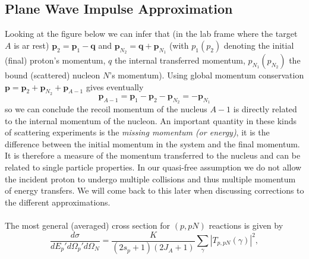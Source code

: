 \documentclass[11pt]{article}
\numberwithin{equation}{section}
\begin{document}
\subsection{Plane Wave Impulse Approximation}
Looking at the figure below we can infer that (in the lab frame where the target $A$ is ar rest) $\mathbf{p}_2 = \mathbf{p}_1 - \mathbf{q}$ and $\mathbf{p}_{N_2} = \mathbf{q} + \mathbf{p}_{N_1}$ (with $p_1 (p_2)$ denoting the initial (final) proton's momentum, $q$ the internal transferred momentum, $p_{N_1} (p_{N_2})$ the bound (scattered) nucleon $N$'s momentum). Using global momentum conservation $\mathbf{p} = \mathbf{p}_2 + \mathbf{p}_{N_2} + \mathbf{p}_{A-1}$ gives eventually
\begin{equation}
	\mathbf{p}_{A-1} = \mathbf{p}_1 - \mathbf{p}_2 - \mathbf{p}_{N_2} = - \mathbf{p}_{N_1}
\end{equation}
so we can conclude the recoil momentum of the nucleus $A-1$ is directly related to the internal momentum of the nucleon. An important quantity in these kinds of scattering experiments is the \emph{missing momentum (or energy)}, it is the difference between the initial momentum in the system and the final momentum. It is therefore a measure of the momentum transferred to the nucleus and can be related to single particle properties. In our quasi-free assumption we do not allow the incident proton to undergo multiple collisions and thus multiple momentum of energy transfers. We will come back to this later when discussing corrections to the different approximations.\\
\\
The most general (averaged) cross section for $(p,pN)$ reactions is given by
\begin{equation}
	\frac{d\sigma}{dE_p' d\Omega_p ' d\Omega_N} = \frac{K}{(2s_p + 1)(2J_A + 1)}\underset{\gamma}\sum |T_{p,pN}(\gamma)|^2,
\end{equation}
\end{document}
